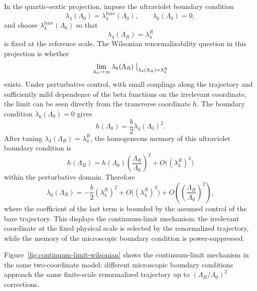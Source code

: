 In the quartic-sextic projection, impose the ultraviolet boundary condition
\[
  \lambda_4(\Lambda_0)=\lambda_4^{\mathrm{bare}}(\Lambda_0),
  \qquad
  \lambda_6(\Lambda_0)=0,
\]
and choose \(\lambda_4^{\mathrm{bare}}(\Lambda_0)\) so that
\[
  \lambda_4(\Lambda_R)=\lambda_4^R
\]
is fixed at the reference scale.  The Wilsonian renormalizability question in
this projection is whether
\begin{equation}
  \lim_{\Lambda_0\to\infty}
  \lambda_6(\Lambda_R)
  \bigm|_{\lambda_4(\Lambda_R)=\lambda_4^R}
  \label{eq:lambda-six-continuum-limit-question}
\end{equation}
exists.  Under perturbative control, with small couplings along the trajectory
and sufficiently mild dependence of the beta functions on the irrelevant
coordinate, the limit can be seen directly from the transverse coordinate
\(h\).  The boundary condition \(\lambda_6(\Lambda_0)=0\) gives
\[
  h(\Lambda_0)
  =
  \frac b2\lambda_4(\Lambda_0)^2 .
\]
After tuning \(\lambda_4(\Lambda_R)=\lambda_4^R\), the homogeneous memory of
this ultraviolet boundary condition is
\[
  h(\Lambda_R)
  =
  h(\Lambda_0)
  \left(\frac{\Lambda_R}{\Lambda_0}\right)^2
  +O\bigl((\lambda_4^R)^3\bigr)
\]
within the perturbative domain.  Therefore
\[
  \lambda_6(\Lambda_R)
  =
  -\frac b2(\lambda_4^R)^2
  +O\bigl((\lambda_4^R)^3\bigr)
  +O\left(\left(\frac{\Lambda_R}{\Lambda_0}\right)^2\right),
\]
where the coefficient of the last term is bounded by the assumed control of
the bare trajectory.  This displays the continuum-limit mechanism: the
irrelevant coordinate at the fixed physical scale is selected by the
renormalized trajectory, while the memory of the microscopic boundary
condition is power-suppressed.

Figure~\ref{fig:continuum-limit-wilsonian} shows the continuum-limit mechanism
in the same two-coordinate model: different microscopic boundary conditions
approach the same finite-scale renormalized trajectory up to
\((\Lambda_R/\Lambda_0)^2\) corrections.

